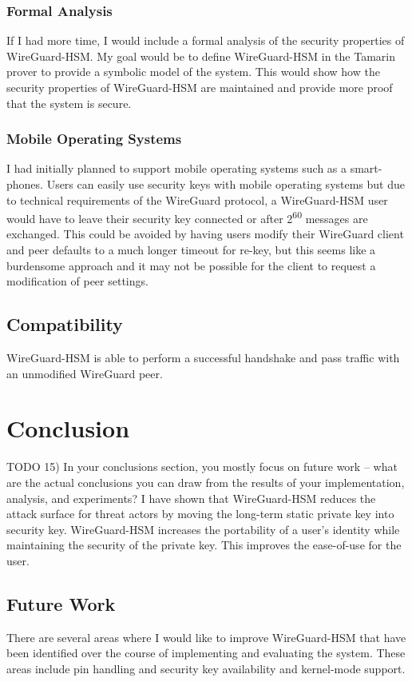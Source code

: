 \documentclass [11pt, proquest] {uwthesis}[2020/02/24]
\begin{document}
\subsection{Formal Analysis}
If I had more time, I would include a formal analysis of the security properties of WireGuard-HSM. My goal would be to define WireGuard-HSM in the Tamarin prover to provide a symbolic model of the system. This would show how the security properties of WireGuard-HSM are maintained and provide more proof that the system is secure.

\subsection{Mobile Operating Systems}
I had initially planned to support mobile operating systems such as a smart-phones. Users can easily use security keys
with mobile operating systems but due to technical requirements of the WireGuard protocol, a WireGuard-HSM user would have to leave their security key connected
or after 2\textsuperscript{60} messages are exchanged. This could be avoided by having users modify their WireGuard client and peer defaults to a much longer timeout for re-key, but this seems like a burdensome approach and it may not be possible for the client to request a modification of peer settings.


\section{Compatibility}
WireGuard-HSM is able to perform a successful handshake and pass traffic with an unmodified WireGuard peer.

\chapter {Conclusion}
 
{TODO 15)  In your conclusions section, you mostly focus on future work -- what are the actual conclusions you can draw from the results of your implementation, analysis, and experiments? } 
I have shown that WireGuard-HSM reduces the attack surface for threat actors by moving the long-term static private key into security key. WireGuard-HSM increases the portability of a user's identity while maintaining the security of the private key. This improves the ease-of-use for the user.

\section {Future Work}
There are several areas where I would like to improve WireGuard-HSM that have been identified over the course of implementing and evaluating the system. These areas include pin handling and security key availability and kernel-mode support.
\end{document}
